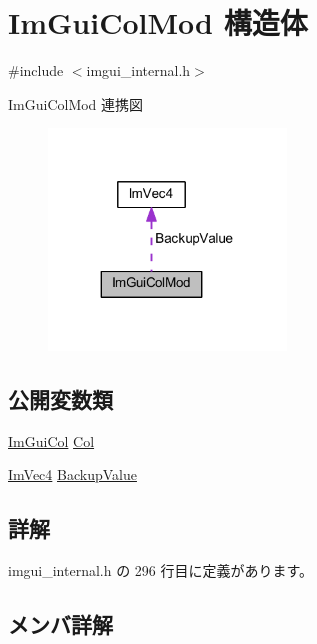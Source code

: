 \hypertarget{struct_im_gui_col_mod}{}\section{Im\+Gui\+Col\+Mod 構造体}
\label{struct_im_gui_col_mod}


{\ttfamily \#include $<$imgui\+\_\+internal.\+h$>$}



Im\+Gui\+Col\+Mod 連携図\nopagebreak
\begin{figure}[H]
\begin{center}
\leavevmode
\includegraphics[width=179pt]{struct_im_gui_col_mod__coll__graph}
\end{center}
\end{figure}
\subsection*{公開変数類}
\begin{DoxyCompactItemize}
\item 
\mbox{\hyperlink{imgui_8h_a1b0467ec582e731ae6292fef726fb5fe}{Im\+Gui\+Col}} \mbox{\hyperlink{struct_im_gui_col_mod_aaa66ad29c378b8800098ab4d4e1c91a6}{Col}}
\item 
\mbox{\hyperlink{struct_im_vec4}{Im\+Vec4}} \mbox{\hyperlink{struct_im_gui_col_mod_a7c23f178bbf5cbdb1333332bb84f73c9}{Backup\+Value}}
\end{DoxyCompactItemize}


\subsection{詳解}


 imgui\+\_\+internal.\+h の 296 行目に定義があります。



\subsection{メンバ詳解}
\mbox{\label{struct_im_gui_col_mod_a7c23f178bbf5cbdb1333332bb84f73c9}} 
